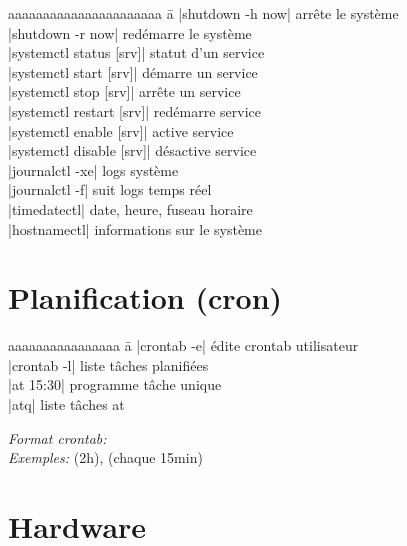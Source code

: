 \documentclass{article}
\begin{document}
\begin{multicols}{4}
    \begin{tabbing}
        aaaaaaaaaaaaaaaaaaaaaa \= a \kill
        \code|shutdown -h now| \> arrête le système \\
        \code|shutdown -r now| \> redémarre le système \\
        \code|systemctl status [srv]| \> statut d'un service \\
        \code|systemctl start [srv]| \> démarre un service \\
        \code|systemctl stop [srv]| \> arrête un service \\
        \code|systemctl restart [srv]| \> redémarre service \\
        \code|systemctl enable [srv]| \> active service \\
        \code|systemctl disable [srv]| \> désactive service \\
        \code|journalctl -xe| \> logs système \\
        \code|journalctl -f| \> suit logs temps réel \\
        \code|timedatectl| \quad date, heure, fuseau horaire \\
        \code|hostnamectl| \quad informations sur le système
    \end{tabbing}

    \section*{Planification (cron)}
    \begin{tabbing}
        aaaaaaaaaaaaaaaa \= a \kill
        \code|crontab -e| \> édite crontab utilisateur \\
        \code|crontab -l| \> liste tâches planifiées \\
        \code|at 15:30| \> programme tâche unique \\
        \code|atq| \> liste tâches at
    \end{tabbing}
    
    \emph{Format crontab:}  \\
    \emph{Exemples:}  (2h),  (chaque 15min)

    \section*{Hardware}


\end{multicols}
\end{document}
